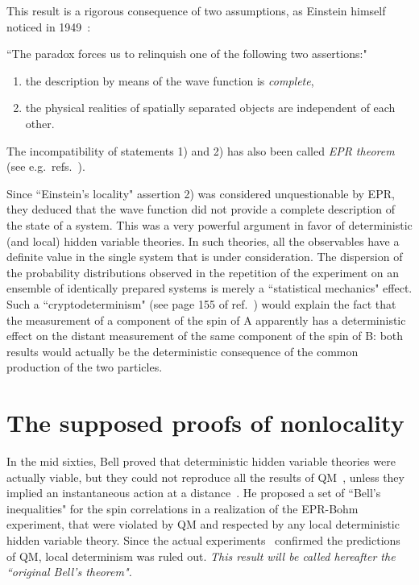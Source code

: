 \documentclass[12pt]{article}
\begin{document}
This result is a rigorous consequence of two assumptions, as Einstein
himself noticed in 1949~\cite{Einstein49}:

``The paradox forces us to relinquish one of the following two
assertions:"
\begin{enumerate} 
\item the description by means of the wave function is {\it
complete},

\item the physical realities of spatially separated objects are
independent of each other.
\end{enumerate}

The incompatibility of statements 1) and 2) has also been called
\emph{EPR theorem} (see e.g.\ refs.~\cite{Ballentine70,Peres,Laloe}).

Since ``Einstein's locality" assertion 2) was considered
unquestionable by EPR, they deduced that the wave function did not
provide a complete description of the state of a system. This was a
very powerful argument in favor of deterministic (and local) hidden
variable theories. In such theories, all the observables have a
definite value in the single system that is under consideration. The
dispersion of the probability distributions observed in the repetition
of the experiment on an ensemble of identically prepared systems is
merely a ``statistical mechanics" effect. Such a ``cryptodeterminism"
(see page 155 of ref.~\cite{Peres}) would explain the fact that the
measurement of a component of the spin of A apparently has a
deterministic effect on the distant measurement of the same component
of the spin of B: both results would actually be the deterministic
consequence of the common production of the two particles.


\section{The supposed proofs of nonlocality} 

In the mid sixties, Bell proved that deterministic hidden variable
theories were actually viable, but they could not reproduce all the
results of QM~\cite{Bell64}, unless they implied an instantaneous
action at a distance~\cite{Bell66}. He proposed a set of ``Bell's
inequalities" for the spin correlations in a realization of the
EPR-Bohm experiment, that were violated by QM and respected by any
local deterministic hidden variable theory. Since the actual
experiments~\cite{Aspect} confirmed the predictions of QM, local
determinism was ruled out. \emph{This result will be called hereafter
the ``original Bell's theorem".}
\end{document}
